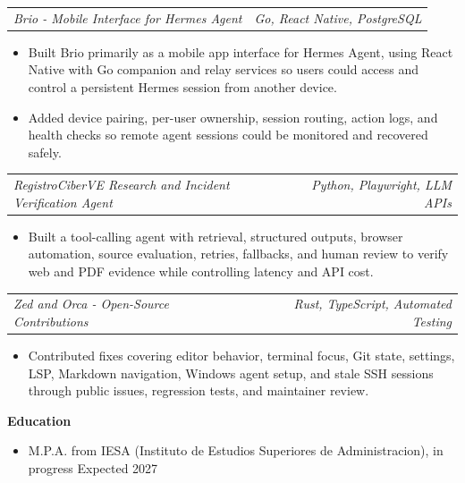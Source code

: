 \documentclass[10pt,letterpaper]{article}
\makeatletter
\newcommand{\bodyfont}{\fontsize{10.5}{15.75}\selectfont}
\newcommand{\sectiontitle}[1]{%
  \par\vspace{4pt}
  {\bodyfont\textbf{#1}}\par
  \nopagebreak[4]
  \vspace{2pt}
}
\newcommand{\roleline}[2]{%
  \begin{tabularx}{\textwidth}{@{}Xr@{}}
    \bodyfont\textit{#1} & \bodyfont\textit{#2}
  \end{tabularx}
  \nopagebreak[4]
  \vspace{1pt}
}
\makeatother
\begin{document}
\vspace{3pt}
\roleline{Brio - Mobile Interface for Hermes Agent}{Go, React Native, PostgreSQL}
\begin{itemize}
  \item Built Brio primarily as a mobile app interface for Hermes Agent, using React Native with Go companion and relay services so users could access and control a persistent Hermes session from another device.
  \item Added device pairing, per-user ownership, session routing, action logs, and health checks so remote agent sessions could be monitored and recovered safely.
\end{itemize}

\vspace{3pt}
\roleline{RegistroCiberVE Research and Incident Verification Agent}{Python, Playwright, LLM APIs}
\begin{itemize}
  \item Built a tool-calling agent with retrieval, structured outputs, browser automation, source evaluation, retries, fallbacks, and human review to verify web and PDF evidence while controlling latency and API cost.
\end{itemize}

\vspace{3pt}
\roleline{Zed and Orca - Open-Source Contributions}{Rust, TypeScript, Automated Testing}
\begin{itemize}
  \item Contributed fixes covering editor behavior, terminal focus, Git state, settings, LSP, Markdown navigation, Windows agent setup, and stale SSH sessions through public issues, regression tests, and maintainer review.
\end{itemize}

\sectiontitle{Education}
\begin{itemize}
  \item M.P.A. from IESA (Instituto de Estudios Superiores de Administracion), in progress \hfill Expected 2027
\end{itemize}
\end{document}
